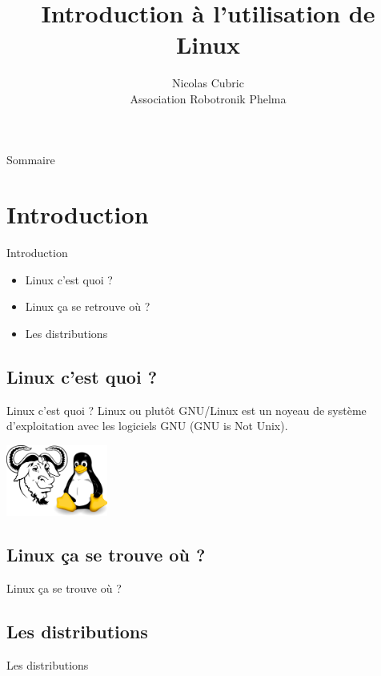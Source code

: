 \documentclass{beamer}
\title{Introduction à l'utilisation de Linux}
\author{Nicolas Cubric\\Association Robotronik Phelma}
\date{}
\institute{Grenoble INP Phelma}
\begin{document}
\maketitle

\begin{frame}{Sommaire}
	\tableofcontents
\end{frame}

\section{Introduction}
\begin{frame}{Introduction}
	\begin{itemize}
		\item Linux c'est quoi ?
		\item Linux ça se retrouve où ?
		\item Les distributions
	\end{itemize}
\end{frame}

\subsection{Linux c'est quoi ?}
\begin{frame}{Linux c'est quoi ?}
	Linux ou plutôt GNU/Linux est un noyeau de système d'exploitation avec les logiciels GNU (GNU is Not Unix).
	\begin{center}
		\includegraphics[width=0.25\textwidth]{Images/GNU_TUX.png}
	\end{center}
\end{frame}

\subsection{Linux ça se trouve où ?}
\begin{frame}{Linux ça se trouve où ?}
\end{frame}

\subsection{Les distributions}
\begin{frame}{Les distributions}
\end{frame}
\end{document}
